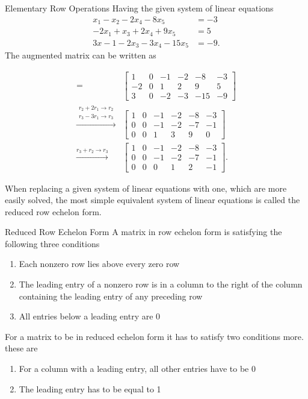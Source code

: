 \begin{example}{Elementary Row Operations}
 Having the given system of linear equations
\begin{align*}
    x_1-x_2-2x_4-8x_5&=-3\\
    -2x_1+x_3+2x_4+9x_5 &= 5\\
    3x-1-2x_3-3x_4-15x_5&=-9.
\end{align*}
The augmented matrix can be written as

\begin{align*}
[A \textbf{b}] =
	&\begin{bmatrix}
	1 & 0 & -1 &-2 & -8 & -3 \\
	-2 & 0 & 1 & 2 & 9 & 5 \\
	3 &0 & -2 & -3 & -15 & -9 
   \end{bmatrix} \\
  \xrightarrow{\substack{r_2+2r_1\rightarrow r_2\\  r_3-3r_1\rightarrow r_3}}
  &\begin{bmatrix}
 	 1 & 0 & -1 &-2 & -8 & -3 \\
 	 0 & 0 & -1 & -2 & -7 & -1 \\
	 0 &0 & 1 & 3 & 9 & 0
  \end{bmatrix}\\
  \xrightarrow{r_3+r_2\rightarrow r_3}
    &\begin{bmatrix}
  	 1 & 0 & -1 &-2 & -8 & -3 \\
 	 0 & 0 & -1 & -2 & -7 & -1 \\
	 0 &0 & 0 & 1 & 2 & -1
       \end{bmatrix}.
\end{align*}
\label{exa:rowoperations}
\end{example}
When replacing a given system of linear equations with one, which are more easily solved, the most simple equivalent system of linear equations is called the reduced row echelon form. 
\begin{definition}{Reduced Row Echelon Form}
A matrix in row echelon form is satisfying the following three conditions
\begin{enumerate}
    \item Each nonzero row lies above every zero row
    \item The leading entry of a nonzero row is in a column to the right of the column containing the leading entry of any preceding row
    \item All entries below a leading entry are $0$
\end{enumerate}
For a matrix to be in reduced echelon form it has to satisfy two conditions more. these are
\begin{enumerate}
    \item For a column with a leading entry, all other entries have to be 0
    \item The leading entry has to be equal to 1
\end{enumerate}
\cite[33]{LiAl}
\end{definition}
